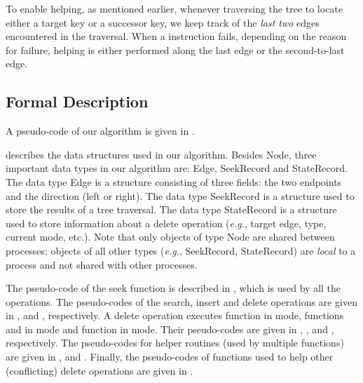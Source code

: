 \begin{limitscope}
To enable helping, as mentioned earlier, whenever traversing the tree to locate either a target key or a successor key, we keep track of the \emph{last two} edges encountered in the traversal. When a \CAS{} instruction fails, depending on the reason for failure, helping is either performed along the last edge or the second-to-last edge. 


\subsection{Formal Description}
A pseudo-code of our algorithm is given in .

 describes the data structures used in our algorithm. Besides \textsf{Node}, three important data types in our algorithm are: \textsf{Edge}, \textsf{SeekRecord} and \textsf{StateRecord}. The data type \textsf{Edge} is a structure consisting of three fields: the two endpoints and the direction (left or right). The data type \textsf{SeekRecord} is a structure used to store the results of a tree traversal. The data type \textsf{StateRecord} is a structure used to store information about a delete operation (\emph{e.g.}, target edge, type,  current mode, etc.). Note that only objects of type \textsf{Node} are shared between processes; objects of all other types (\emph{e.g.}, \textsf{SeekRecord}, \textsf{StateRecord}) are \emph{local} to a process and not shared with other processes.

The pseudo-code of the seek function is described in , which is used by all the operations. The pseudo-codes of the search, insert and delete operations are given in ,  and , respectively. A delete operation executes  function \Inject{} in \injection{} mode, functions \FindAndMarkSuccessor{} and \RemoveSuccessor{} in \discovery{} mode and function \Cleanup{} in \cleanup{} mode. Their pseudo-codes are given in , ,  and , respectively. The pseudo-codes for helper routines (used by multiple functions) are given in ,  and . Finally, the pseudo-codes of functions used to help other (conflicting) delete operations are given in .


\end{limitscope}